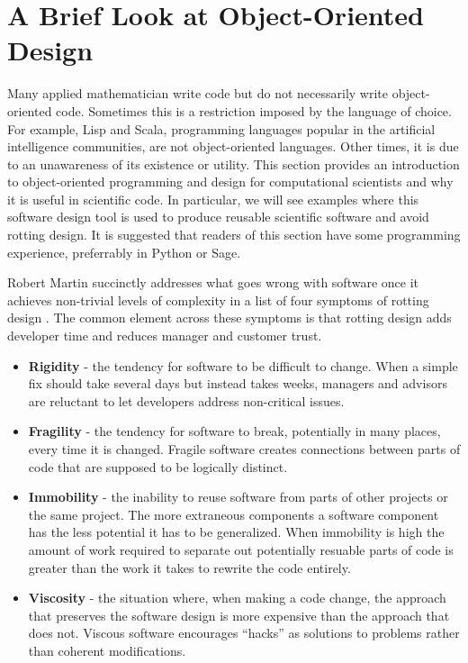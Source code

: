 \section{A Brief Look at Object-Oriented Design}\label{sec:object-oriented-design}

Many applied mathematician write code but do not necessarily write
object-oriented code. Sometimes this is a restriction imposed by the language of
choice. For example, Lisp and Scala, programming languages popular in the
artificial intelligence communities, are not object-oriented languages. Other
times, it is due to an unawareness of its existence or utility. This section
provides an introduction to object-oriented programming and design for
computational scientists and why it is useful in scientific code. In particular,
we will see examples where this software design tool is used to produce reusable
scientific software and avoid rotting design. It is suggested that readers of
this section have some programming experience, preferrably in Python or Sage.

Robert Martin succinctly addresses what goes wrong with software once it
achieves non-trivial levels of complexity in a list of four symptoms of rotting
design \cite{martin2000design}. The common element across these symptoms is that
rotting design adds developer time and reduces manager and customer trust.
\begin{itemize}
\item {\bf Rigidity} - the tendency for software to be difficult to change. When
  a simple fix should take several days but instead takes weeks, managers and
  advisors are reluctant to let developers address non-critical issues.
\item {\bf Fragility} - the tendency for software to break, potentially in many
  places, every time it is changed. Fragile software creates connections between
  parts of code that are supposed to be logically distinct.
\item {\bf Immobility} - the inability to reuse software from parts of other
  projects or the same project. The more extraneous components a software
  component has the less potential it has to be generalized.  When 
  immobility is high the amount of work required to separate out potentially
  resuable parts of code is greater than the work it takes to rewrite the code
  entirely.
\item {\bf Viscosity} - the situation where, when making a code change, the
  approach that preserves the software design is more expensive than the
  approach that does not. Viscous software encourages ``hacks'' as solutions to
  problems rather than coherent modifications.
\end{itemize}

